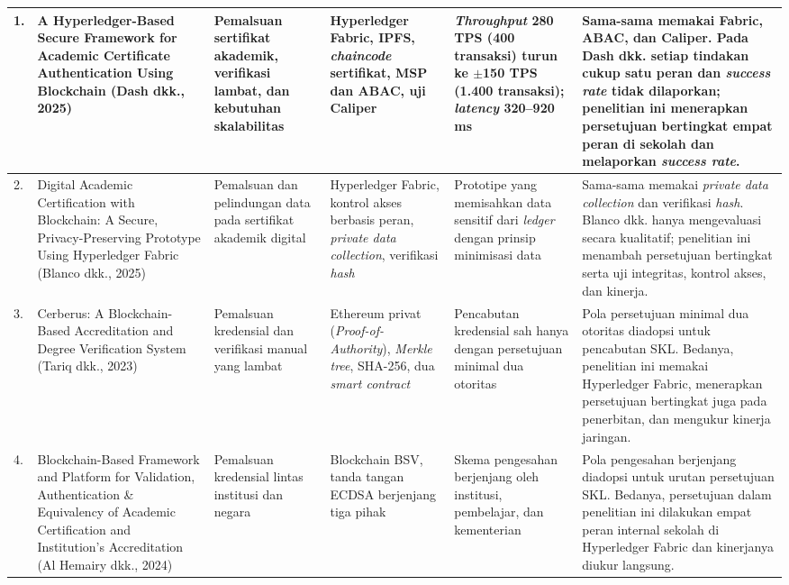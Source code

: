 \begin{longtable}{|p{}|p{}|p{}|p{}|p{}|p{}|}
	\hline
	1. & A Hyperledger-Based Secure Framework for Academic Certificate Authentication Using Blockchain (Dash dkk., 2025)~\cite{Dash2025Hyperledger} & Pemalsuan sertifikat akademik, verifikasi lambat, dan kebutuhan skalabilitas & Hyperledger Fabric, IPFS, \textit{chaincode} sertifikat, MSP dan ABAC, uji Caliper & \textit{Throughput} 280 TPS (400 transaksi) turun ke $\pm$150 TPS (1.400 transaksi); \textit{latency} 320--920 ms & Sama-sama memakai Fabric, ABAC, dan Caliper. Pada Dash dkk. setiap tindakan cukup satu peran dan \textit{success rate} tidak dilaporkan; penelitian ini menerapkan persetujuan bertingkat empat peran di sekolah dan melaporkan \textit{success rate}.\\
	\hline
	2. & Digital Academic Certification with Blockchain: A Secure, Privacy-Preserving Prototype Using Hyperledger Fabric (Blanco dkk., 2025)~\cite{Blanco2025Digital} & Pemalsuan dan pelindungan data pada sertifikat akademik digital & Hyperledger Fabric, kontrol akses berbasis peran, \textit{private data collection}, verifikasi \textit{hash} & Prototipe yang memisahkan data sensitif dari \textit{ledger} dengan prinsip minimisasi data & Sama-sama memakai \textit{private data collection} dan verifikasi \textit{hash}. Blanco dkk. hanya mengevaluasi secara kualitatif; penelitian ini menambah persetujuan bertingkat serta uji integritas, kontrol akses, dan kinerja.\\
	\hline
	3. & Cerberus: A Blockchain-Based Accreditation and Degree Verification System (Tariq dkk., 2023)~\cite{Tariq2023Cerberus} & Pemalsuan kredensial dan verifikasi manual yang lambat & Ethereum privat (\textit{Proof-of-Authority}), \textit{Merkle tree}, SHA-256, dua \textit{smart contract} & Pencabutan kredensial sah hanya dengan persetujuan minimal dua otoritas & Pola persetujuan minimal dua otoritas diadopsi untuk pencabutan SKL. Bedanya, penelitian ini memakai Hyperledger Fabric, menerapkan persetujuan bertingkat juga pada penerbitan, dan mengukur kinerja jaringan.\\
	\hline
	4. & Blockchain-Based Framework and Platform for Validation, Authentication \& Equivalency of Academic Certification and Institution's Accreditation (Al Hemairy dkk., 2024)~\cite{AlHemairy2024UAE} & Pemalsuan kredensial lintas institusi dan negara & Blockchain BSV, tanda tangan ECDSA berjenjang tiga pihak & Skema pengesahan berjenjang oleh institusi, pembelajar, dan kementerian & Pola pengesahan berjenjang diadopsi untuk urutan persetujuan SKL. Bedanya, persetujuan dalam penelitian ini dilakukan empat peran internal sekolah di Hyperledger Fabric dan kinerjanya diukur langsung.\\

\end{longtable}
